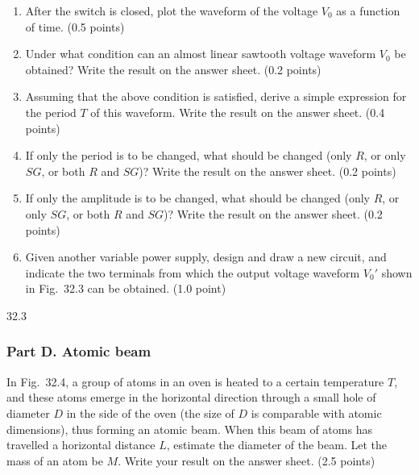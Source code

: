 \begin{enumerate}
\item[(a)] After the switch is closed, plot the waveform of the voltage $V_0$ as a function of time. (0.5 points)
\item[(b)] Under what condition can an almost linear sawtooth voltage waveform $V_0$ be obtained? Write the result on the answer sheet. (0.2 points)
\item[(c)] Assuming that the above condition is satisfied, derive a simple expression for the period $T$ of this waveform. Write the result on the answer sheet. (0.4 points)
\item[(d)] If only the period is to be changed, what should be changed (only $R$, or only $SG$, or both $R$ and $SG$)? Write the result on the answer sheet. (0.2 points)
\item[(e)] If only the amplitude is to be changed, what should be changed (only $R$, or only $SG$, or both $R$ and $SG$)? Write the result on the answer sheet. (0.2 points)
\item[(f)] Given another variable power supply, design and draw a new circuit, and indicate the two terminals from which the output voltage waveform $V_0'$ shown in Fig.~32.3 can be obtained. (1.0 point)
\end{enumerate}

\begin{figbox}{32.3}
\end{figbox}

\subsubsection*{Part D. Atomic beam}

In Fig.~32.4, a group of atoms in an oven is heated to a certain temperature $T$, and these atoms emerge in the horizontal direction through a small hole of diameter $D$ in the side of the oven (the size of $D$ is comparable with atomic dimensions), thus forming an atomic beam. When this beam of atoms has travelled a horizontal distance $L$, estimate the diameter of the beam. Let the mass of an atom be $M$. Write your result on the answer sheet. (2.5 points)

